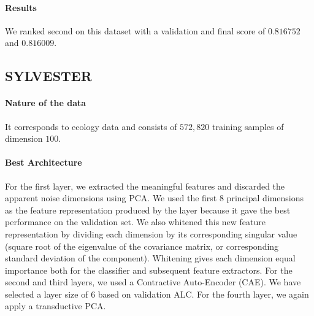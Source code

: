 \paragraph{Results}

We ranked second on this dataset with a validation and final score of
$0.816752$ and $0.816009$.

\subsection{SYLVESTER} 

\paragraph{Nature of the data} It corresponds to ecology data and consists of $572,820$ training samples of dimension $100$.

\paragraph{Best Architecture}


For the first layer, we extracted the meaningful features and discarded the apparent noise
dimensions using PCA. We used the first 8 principal dimensions as the feature
representation produced by the layer because it gave the best performance on
the validation set. We also whitened this new feature representation by dividing
each dimension by its corresponding singular value (square root of the eigenvalue
of the covariance matrix, or corresponding standard deviation of the component). 
Whitening gives each dimension
equal importance both for the classifier and subsequent feature extractors.
For the second and third layers, we used a Contractive Auto-Encoder (CAE).  We
have selected a layer size of 6 based on validation ALC.
For the fourth layer, we again apply a transductive PCA.

